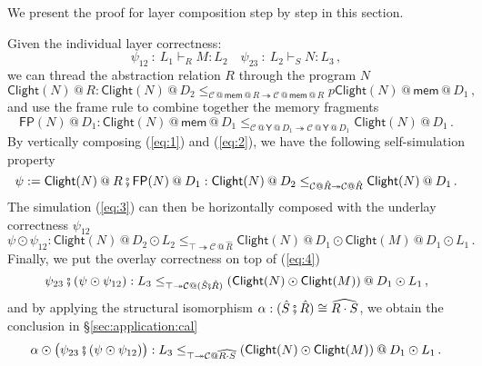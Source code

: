 \documentclass[acmsmall,screen,review,anonymous,nonacm]{acmart}
\newcommand{\kw}[1]{\ensuremath{ \mathsf{#1} }}
\newcommand{\jr}{\mathsf{Y}}
\newcommand{\vcomp}{\fatsemi}
\begin{document}
We present the proof for
layer composition
step by step in this section.

Given the individual layer correctness:
\[
  \psi_{12} \: : \: L_1 \vdash_R M : L_2
  \quad
  \psi_{23} \: : \: L_2 \vdash_S N : L_3
  \,,
\]
we can thread the abstraction relation $R$
through the program $N$
\begin{equation}
  \label{eq:1}
  \kw{Clight}(N)\mathbin@ R :
  \kw{Clight}(N) \mathbin@ D_2
  \le_{\mathcal{C}\mathbin@ \kw{mem} \mathbin@ R \twoheadrightarrow \mathcal{C}\mathbin@ \kw{mem} \mathbin@ R}
p  \kw{Clight}(N) \mathbin@ \kw{mem} \mathbin@ D_1
  \,,
\end{equation}
and use the frame rule to combine together the memory fragments
\begin{equation}
  \label{eq:2}
  \kw{FP}(N)\mathbin@ D_1 :
  \kw{Clight}(N) \mathbin@ \kw{mem} \mathbin@ D_1
  \le_{\mathcal{C}\mathbin@ \jr \mathbin@ D_1 \twoheadrightarrow \mathcal{C}\mathbin@ \jr \mathbin@ D_1}
  \kw{Clight}(N) \mathbin@ D_1
  \,.
\end{equation}
By vertically composing (\ref{eq:1}) and (\ref{eq:2}), we have
the following self-simulation property
\begin{equation}
  \label{eq:3}
  \psi :=
  \kw{Clight}(N)\mathbin@ R \vcomp \kw{FP}(N)\mathbin@ D_1 :
  \kw{Clight}(N) \mathbin@ D_2
  \le_{\mathcal{C}\mathbin@ \hat{R} \twoheadrightarrow \mathcal{C}\mathbin@ \hat{R}}
  \kw{Clight}(N) \mathbin@ D_1
  \,.
\end{equation}
The simulation (\ref{eq:3}) can then be horizontally composed
with the underlay correctness $\psi_{12}$
\begin{equation}
  \label{eq:4}
  \psi \odot \psi_{12} :
  \kw{Clight}(N) \mathbin@ D_2 \odot L_2
  \le_{\top \twoheadrightarrow \mathcal{C}\mathbin@ \hat{R}}
  \kw{Clight}(N) \mathbin@ D_1 \odot \kw{Clight}(M) \mathbin@ D_1 \odot L_1
  \,.
\end{equation}
Finally, we put the overlay correctness on top of (\ref{eq:4})
\begin{equation}
  \label{eq:5}
  \psi_{23}\vcomp (\psi \odot \psi_{12}) :
  L_3
  \le_{\top \twoheadrightarrow \mathcal{C}\mathbin@ (\hat{S} \vcomp \hat{R})}
  (\kw{Clight}(N) \mathbin \odot \kw{Clight}(M)) \mathbin@ D_1 \odot L_1
  \,,
\end{equation}
and
by applying
the structural isomorphism
$\alpha : (\hat{S} \vcomp \hat{R}) \cong \widehat{R \cdot S}$,
we obtain the conclusion in \S\ref{sec:application:cal}
\[
  \alpha \odot \big(
  \psi_{23} \vcomp (\psi \odot \psi_{12}) \big) :
  L_3
  \le_{\top \twoheadrightarrow \mathcal{C}\mathbin@ \widehat{R \cdot S}}
  (\kw{Clight}(N) \mathbin \odot \kw{Clight}(M)) \mathbin@ D_1 \odot L_1
  \,.
\]
\end{document}
